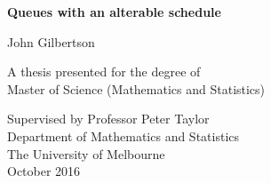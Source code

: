 \begin{titlepage}
    \begin{center}
        \vspace*{1cm}
        
        \Huge
        \textbf{Queues with an alterable schedule}
        
        \vspace{0.5cm}
        
        \LARGE
        John Gilbertson
        
        \vfill
        
        A thesis presented for the degree of\\
        Master of Science (Mathematics and Statistics)
        
        \vspace{0.8cm}
        
        \Large
        Supervised by Professor Peter Taylor\\
        Department of Mathematics and Statistics\\
        The University of Melbourne\\
        October 2016
        
    \end{center}
\end{titlepage}














































